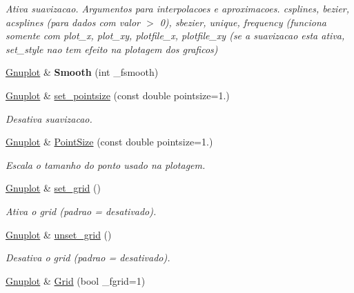 \begin{DoxyCompactItemize}
\begin{DoxyCompactList}\small\item\em Ativa suavizacao. Argumentos para interpolacoes e aproximacoes. csplines, bezier, acsplines (para dados com valor $>$ 0), sbezier, unique, frequency (funciona somente com plot\-\_\-x, plot\-\_\-xy, plotfile\-\_\-x, plotfile\-\_\-xy (se a suavizacao esta ativa, set\-\_\-style nao tem efeito na plotagem dos graficos) \end{DoxyCompactList}\item 
\hypertarget{classGnuplot_a9eaf8050edfad9d926d41b102d2f24cb}{\hyperlink{classGnuplot}{Gnuplot} \& {\bfseries Smooth} (int \-\_\-fsmooth)}\label{classGnuplot_a9eaf8050edfad9d926d41b102d2f24cb}

\item 
\hyperlink{classGnuplot}{Gnuplot} \& \hyperlink{classGnuplot_a95ec1636a871447dfe99463b769339c7}{set\-\_\-pointsize} (const double pointsize=1.)
\begin{DoxyCompactList}\small\item\em Desativa suavizacao. \end{DoxyCompactList}\item 
\hypertarget{classGnuplot_adb4a794cf81d9b615f133feca1e917e8}{\hyperlink{classGnuplot}{Gnuplot} \& \hyperlink{classGnuplot_adb4a794cf81d9b615f133feca1e917e8}{Point\-Size} (const double pointsize=1.)}\label{classGnuplot_adb4a794cf81d9b615f133feca1e917e8}

\begin{DoxyCompactList}\small\item\em Escala o tamanho do ponto usado na plotagem. \end{DoxyCompactList}\item 
\hypertarget{classGnuplot_a4b7245b12dad1c0ef326e5f59eb83001}{\hyperlink{classGnuplot}{Gnuplot} \& \hyperlink{classGnuplot_a4b7245b12dad1c0ef326e5f59eb83001}{set\-\_\-grid} ()}\label{classGnuplot_a4b7245b12dad1c0ef326e5f59eb83001}

\begin{DoxyCompactList}\small\item\em Ativa o grid (padrao = desativado). \end{DoxyCompactList}\item 
\hypertarget{classGnuplot_a8b9a16d5793c3f4939b917b2c263860c}{\hyperlink{classGnuplot}{Gnuplot} \& \hyperlink{classGnuplot_a8b9a16d5793c3f4939b917b2c263860c}{unset\-\_\-grid} ()}\label{classGnuplot_a8b9a16d5793c3f4939b917b2c263860c}

\begin{DoxyCompactList}\small\item\em Desativa o grid (padrao = desativado). \end{DoxyCompactList}\item 
\hypertarget{classGnuplot_a67e669cdac3b09ae16678f5211dda786}{\hyperlink{classGnuplot}{Gnuplot} \& \hyperlink{classGnuplot_a67e669cdac3b09ae16678f5211dda786}{Grid} (bool \-\_\-fgrid=1)}\label{classGnuplot_a67e669cdac3b09ae16678f5211dda786}


\end{DoxyCompactItemize}
